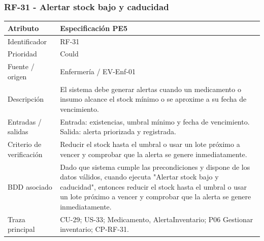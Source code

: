 \documentclass[11pt,a4paper]{article}
\begin{document}
	\subsubsection{RF-31 - Alertar stock bajo y caducidad}
	\begin{tabularx}{\textwidth}{p{3.2cm}Y}
		\toprule
		\textbf{Atributo} & \textbf{Especificación PE5}\\\midrule
		Identificador & RF-31\\
		Prioridad & Could\\
		Fuente / origen & Enfermería / EV-Enf-01\\
		Descripción & El sistema debe generar alertas cuando un medicamento o insumo alcance el stock mínimo o se aproxime a su fecha de vencimiento.\\
		Entradas / salidas & Entrada: existencias, umbral mínimo y fecha de vencimiento. Salida: alerta priorizada y registrada.\\
		Criterio de verificación & Reducir el stock hasta el umbral o usar un lote próximo a vencer y comprobar que la alerta se genere inmediatamente.\\
		BDD asociado & Dado que sistema cumple las precondiciones y dispone de los datos válidos, cuando ejecuta "Alertar stock bajo y caducidad", entonces reducir el stock hasta el umbral o usar un lote próximo a vencer y comprobar que la alerta se genere inmediatamente.\\
		Traza principal & CU-29; US-33; Medicamento, AlertaInventario; P06 Gestionar inventario; CP-RF-31.\\
		\bottomrule
	\end{tabularx}
\end{document}
